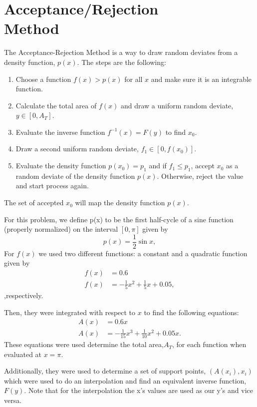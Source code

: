 \section{Acceptance/Rejection \\Method}

The Acceptance-Rejection Method is a way to draw random deviates from a density function, $p(x)$. The steps are the following:
\begin{enumerate}
    \item Choose a function $f(x) > p(x)$ for all $x$ and make sure it is an integrable function.
    \item Calculate the total area of $f(x)$ and draw a uniform random deviate,$y \in [0,A_T]$.
    \item Evaluate the inverse function $f^{-1}(x)=F(y)$ to find $x_0$.
    \item Draw a second uniform random deviate, $f_1 \in[0,f(x_0)]$.
    \item Evaluate the density function $p(x_0)=p_1$ and if $f_1\leq p_1$, accept $x_0$ as a random deviate of the density function $p(x)$. Otherwise, reject the value and start process again.
\end{enumerate}

The set of accepted $x_0$ will map the density function $p(x)$. 

For this problem, we define p(x) to be the first half-cycle of a sine function (properly normalized) on the interval $[0,\pi]$ given by
\begin{equation}
    p(x)=\frac{1}{2}\sin{x},
\end{equation}
For $f(x)$ we used two different functions: a constant and a quadratic function given by 
\begin{align}
    f(x)&=0.6\\
    f(x)&=-\frac{1}{5}x^2 + \frac{1}{5}x+0.05,
\end{align}
,respectively.

Then, they were integrated with respect to $x$ to find the following equations:
\begin{align}
    A(x)&=0.6x\\
    A(x)&=-\frac{1}{15}x^3 + \frac{1}{10}x^2 + 0.05x.
\end{align}
These equations were used determine the total area,$A_T$, for each function when evaluated at $x=\pi$. 

Additionally, they were used to determine a set of support points, $(A(x_i),x_i)$ which were used to do an interpolation and find an equivalent inverse function, $F(y)$. Note that for the interpolation the x's values are used as our y's and vice versa. 

